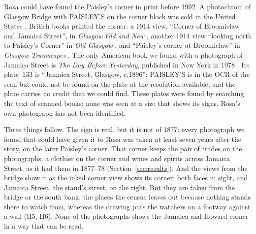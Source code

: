 \documentclass[10pt,a4paper]{article}
\begin{document}
Rosa could have found the Paisley's corner in print before 1992. A photochrom of Glasgow Bridge with PAISLEY'S on the corner block was sold in the United States \citep{locphotochrom13174}. British books printed the corner: a 1914 view, ``Corner of Broomielaw and Jamaica Street'', in \emph{Glasgow Old and New} \citep[p.~45]{house1974}, another 1914 view ``looking north to Paisley's Corner'' in \emph{Old Glasgow} \citep[p.~61]{morton1988}, and ``Paisley's corner at Broomielaw'' in \emph{Glasgow Tramscapes} \citep[p.~7]{stewart1984}. The only American book we found with a photograph of Jamaica Street is \emph{The Day Before Yesterday}, published in New York in 1978 \citep{quennell1978}. Its plate~133 is ``Jamaica Street, Glasgow, c.1896'': PAISLEY'S is in the OCR of the scan but could not be found on the plate at the resolution available, and the plate carries no credit that we could find. These plates were found by searching the text of scanned books; none was seen at a size that shows its signs. Rosa's own photograph has not been identified.

Three things follow. The sign is real, but it is not of 1877: every photograph we found that could have given it to Rosa was taken at least seven years after the story, on the later Paisley's corner. That corner keeps the pair of trades on the photographs, a clothier on the corner and wines and spirits across Jamaica Street, as it had them in 1877--78 (Section~\ref{sec:results}). And the views from the bridge show it as the inked corner view shows its corner: both faces in sight, and Jamaica Street, the stand's street, on the right. But they are taken from the bridge or the south bank, the places the census leaves out because nothing stands there to watch from, whereas the drawing puts the watchers on a footway against a wall (H5, H6). None of the photographs shows the Jamaica and Howard corner in a way that can be read.
\end{document}
